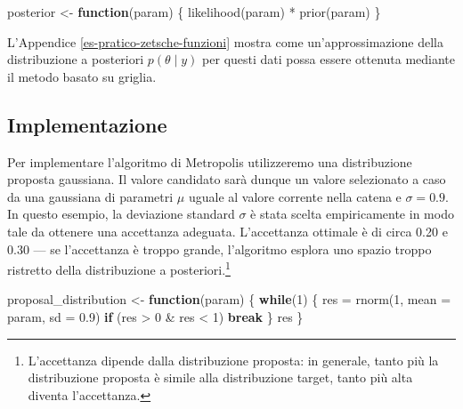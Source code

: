 \documentclass[
  10pt,
  italian,
  a4paper,
  extrafontsizes,onecolumn,openright
  ]{memoir}
\newenvironment{Shaded}{\begin{snugshade}}{\end{snugshade}}
\newcommand{\AttributeTok}[1]{\textcolor[rgb]{0.77,0.63,0.00}{#1}}
\newcommand{\ControlFlowTok}[1]{\textcolor[rgb]{0.13,0.29,0.53}{\textbf{#1}}}
\newcommand{\DecValTok}[1]{\textcolor[rgb]{0.00,0.00,0.81}{#1}}
\newcommand{\FloatTok}[1]{\textcolor[rgb]{0.00,0.00,0.81}{#1}}
\newcommand{\FunctionTok}[1]{\textcolor[rgb]{0.00,0.00,0.00}{#1}}
\newcommand{\NormalTok}[1]{#1}
\newcommand{\OtherTok}[1]{\textcolor[rgb]{0.56,0.35,0.01}{#1}}
\newcommand{\SpecialCharTok}[1]{\textcolor[rgb]{0.00,0.00,0.00}{#1}}
\begin{document}
\begin{Shaded}
\begin{Highlighting}[]
\NormalTok{posterior }\OtherTok{\textless{}{-}} \ControlFlowTok{function}\NormalTok{(param) \{}
  \FunctionTok{likelihood}\NormalTok{(param) }\SpecialCharTok{*} \FunctionTok{prior}\NormalTok{(param)}
\NormalTok{\}}
\end{Highlighting}
\end{Shaded}

L'Appendice \ref{es-pratico-zetsche-funzioni} mostra come un'approssimazione della distribuzione a posteriori \(p(\theta \mid y)\) per questi dati possa essere ottenuta mediante il metodo basato su griglia.

\hypertarget{implementazione}{%
\subsection{Implementazione}\label{implementazione}}

Per implementare l'algoritmo di Metropolis utilizzeremo una distribuzione proposta gaussiana. Il valore candidato sarà dunque un valore selezionato a caso da una gaussiana di parametri \(\mu\) uguale al valore corrente nella catena e \(\sigma = 0.9\). In questo esempio, la deviazione standard \(\sigma\) è stata scelta empiricamente in modo tale da ottenere una accettanza adeguata. L'accettanza ottimale è di circa 0.20 e 0.30 --- se l'accettanza è troppo grande, l'algoritmo esplora uno spazio troppo ristretto della distribuzione a posteriori.\footnote{L'accettanza dipende dalla distribuzione proposta: in generale, tanto più la distribuzione proposta è simile alla distribuzione target, tanto più alta diventa l'accettanza.}

\begin{Shaded}
\begin{Highlighting}[]
\NormalTok{proposal\_distribution }\OtherTok{\textless{}{-}} \ControlFlowTok{function}\NormalTok{(param) \{}
  \ControlFlowTok{while}\NormalTok{(}\DecValTok{1}\NormalTok{) \{}
\NormalTok{    res }\OtherTok{=} \FunctionTok{rnorm}\NormalTok{(}\DecValTok{1}\NormalTok{, }\AttributeTok{mean =}\NormalTok{ param, }\AttributeTok{sd =} \FloatTok{0.9}\NormalTok{)}
    \ControlFlowTok{if}\NormalTok{ (res }\SpecialCharTok{\textgreater{}} \DecValTok{0} \SpecialCharTok{\&}\NormalTok{ res }\SpecialCharTok{\textless{}} \DecValTok{1}\NormalTok{)}
      \ControlFlowTok{break}
\NormalTok{  \}}
\NormalTok{  res}
\NormalTok{\}}
\end{Highlighting}
\end{Shaded}
\end{document}
